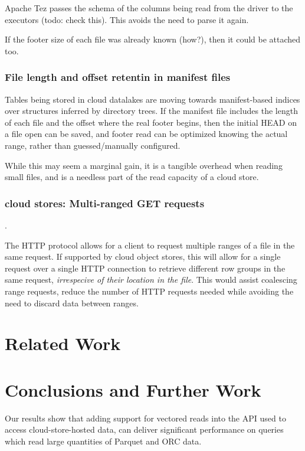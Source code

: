\documentclass[manuscript]{acmart}
\begin{document}
Apache Tez passes the schema of the columns being read from the driver to
the executors (todo: check this).
This avoids the need to parse it again.

If the footer size of each file was already known (how?), then it could be
attached too.


\subsubsection{File length and offset retentin in manifest files}

Tables being stored in cloud datalakes are moving towards manifest-based indices over structures inferred by directory trees.
If the manifest file includes the length of each file and the offset where the
real footer begins, then the initial HEAD on a file open can be saved,
and footer read can be optimized knowing the actual range, rather
than guessed/manually configured.

While this may seem a marginal gain, it is a tangible overhead when reading
small files, and is a needless part of the read capacity of a cloud store.



\subsubsection{cloud stores: Multi-ranged GET requests}.

The HTTP protocol allows for a client to request multiple ranges of a file
in the same request.
If supported by cloud object stores, this will allow for a single request
over a single HTTP connection to retrieve different row groups in the same
request, \emph{irrespecive of their location in the file}.
This would assist coalescing range requests, reduce the number of HTTP requests
needed while avoiding the need to discard data between ranges.



\section{Related Work}\label{sec:related-work}

\section{Conclusions and Further Work}\label{sec:conclusions-and-further-work}

Our results show that adding support for vectored reads into the API used to
access cloud-store-hosted data, can deliver significant performance
on queries which read large quantities of Parquet and ORC data.
\end{document}
